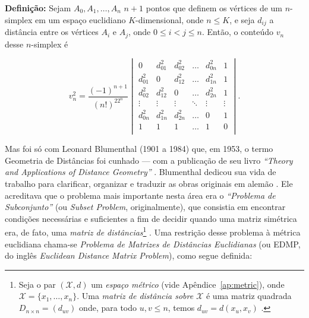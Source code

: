 \begin{center}
	\begin{minipage}{0.9 \linewidth}
		\textbf{Definição:} Sejam $A_0, A_1, \dots, A_n$ $n + 1$ pontos que definem os vértices de um $n$-simplex em um espaço euclidiano $K$-dimensional, onde $n\leq K$, e seja $d_{ij}$ a distância entre os vértices $A_i$ e $A_j$, onde $0\leq i < j \leq n$. Então, o conteúdo $v_n$ desse $n$-simplex é
	\end{minipage}
\end{center} 

\vspace{-0.5cm}

\begin{equation}\tag{Determinante de Cayley-Menger}
v_n^2 = \frac{(-1)^{n+1}}{(n!)^22^n}
\begin{vmatrix}
0 & d^2_{01} &  d^2_{02} & \ldots & d^2_{0n} & 1\\ 
d^2_{01} & 0 & d^2_{12} & \ldots & d^2_{1n} & 1\\ 
d^2_{02} & d^2_{12} &  0 & \ldots & d^2_{2n} & 1\\ 
\vdots & \vdots &  \vdots & \ddots & \vdots & \vdots\\ 
d^2_{0n} & d^2_{1n} & d^2_{2n}  & \ldots & 0 & 1\\ 
1 & 1 & 1  & \ldots & 1 & 0\\ 
\end{vmatrix}.
\label{determinanteCayleyMenger}
\end{equation}

Mas foi só com Leonard Blumenthal (1901 a 1984) que, em 1953, o termo Geometria de Distâncias foi cunhado --- com a publicação de seu livro \textit{``Theory and Applications of Distance Geometry''} \cite{Blumenthal:53}.
Blumenthal dedicou sua vida de trabalho para clarificar, organizar e traduzir as obras originais em alemão \cite{libertiEDG}. Ele acreditava que o problema mais importante nesta área era o \textit{``Problema de Subconjunto''} (ou \textit{Subset Problem}, originalmente), que consistia em encontrar condições necessárias e suficientes a fim de decidir quando uma matriz simétrica era, de fato, uma \textit{matriz de distâncias}\footnote{Seja o par $(\mathcal{X}, d)$ um \textit{espaço métrico} (vide Apêndice~\ref{ap:metric}), onde $\mathcal{X} = \{x_1, \dots, x_n\}$. Uma \textit{matriz de distância sobre $\mathcal{X}$} é uma matriz quadrada $D_{n\times n} = (d_{uv})$ onde, para todo $u,v \leq n$, temos $d_{uv} = d(x_u,x_v)$ \cite{carlileGDandAplications}.} \cite{carlileGDandAplications}. Uma restrição desse problema à métrica euclidiana chama-se \textit{Problema de Matrizes de Distâncias Euclidianas} (ou EDMP, do inglês \textit{Euclidean Distance Matrix Problem}), como segue definida:


